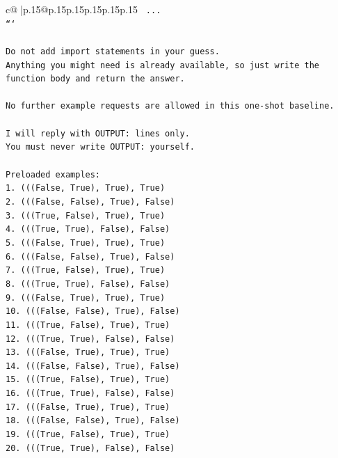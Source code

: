 \documentclass{article}
\begin{document}
{\begin{supertabular}{c@{$\;$}|p{.15\linewidth}@{}p{.15\linewidth}p{.15\linewidth}p{.15\linewidth}p{.15\linewidth}p{.15\linewidth}}
{{{\texttt{    ...} \\
\texttt{```} \\
\\ 
\texttt{Do not add import statements in your guess.} \\
\texttt{Anything you might need is already available, so just write the function body and return the answer.} \\
\\ 
\texttt{No further example requests are allowed in this one{-}shot baseline.} \\
\\ 
\texttt{I will reply with OUTPUT: lines only.} \\
\texttt{You must never write OUTPUT: yourself.} \\
\\ 
\texttt{Preloaded examples:} \\
\texttt{1. (((False, True), True), True)} \\
\texttt{2. (((False, False), True), False)} \\
\texttt{3. (((True, False), True), True)} \\
\texttt{4. (((True, True), False), False)} \\
\texttt{5. (((False, True), True), True)} \\
\texttt{6. (((False, False), True), False)} \\
\texttt{7. (((True, False), True), True)} \\
\texttt{8. (((True, True), False), False)} \\
\texttt{9. (((False, True), True), True)} \\
\texttt{10. (((False, False), True), False)} \\
\texttt{11. (((True, False), True), True)} \\
\texttt{12. (((True, True), False), False)} \\
\texttt{13. (((False, True), True), True)} \\
\texttt{14. (((False, False), True), False)} \\
\texttt{15. (((True, False), True), True)} \\
\texttt{16. (((True, True), False), False)} \\
\texttt{17. (((False, True), True), True)} \\
\texttt{18. (((False, False), True), False)} \\
\texttt{19. (((True, False), True), True)} \\
\texttt{20. (((True, True), False), False)} \\
}}}
\end{supertabular}}
\end{document}

